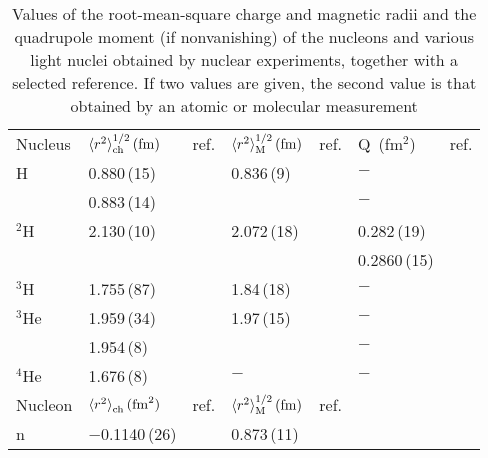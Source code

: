 \documentclass{svmult}
\begin{document}
\begin{table}
\centering
\caption{Values of the root-mean-square charge and magnetic radii and the
quadrupole moment (if nonvanishing) of the nucleons and various light nuclei
obtained by nuclear experiments, together with a selected reference. If two
values are given, the second value is that obtained by an atomic or molecular
measurement}
\begin{tabular}{l l l l l l l}
\hline \noalign{\smallskip}
Nucleus \hspace{0.1in} 
&$\langle r^2 \rangle_{\rm ch}^{1/2}\, ({\rm fm})$\hspace{0.1in} 
&ref.\hspace{0.3in} 
& $\langle r^2 \rangle_{\rm M}^{1/2}\, ({\rm fm})$ \hspace{0.2in}
&ref. \hspace{0.15in} 
&Q\, (fm$^2$) \hspace{0.3in} 
& ref.  \\ \noalign{\smallskip} \hline
{ }H   & 0.880\,(15)&\cite{Coulomb}&0.836\,(9)&\cite{fit}  &\mbox{$-$}  & 
\rule{0in}{2.5ex} \\ 
      & 0.883\,(14)&\cite{2loop} &           &            &\mbox{$-$}  & \\ 
\hline
$^2$H & 2.130\,(10)&\cite{ST}    & 2.072\,(18)&\cite{ingo}&0.282\,(19) &
\cite{Qnuc} \rule{0in}{2.5ex} \\ 
      &            &             &           &            &0.2860\,(15)&
\cite{Qhd1,Qhd2} \rule{0in}{2.5ex} \\ \hline
$^3$H & 1.755\,(87)&\cite{ingo}  & 1.84\,(18)&\cite{ingo} &\mbox{$-$}  & 
\rule{0in}{2.5ex} \\ \hline
$^3$He& 1.959\,(34)&\cite{ingo}  & 1.97\,(15)&\cite{ingo} &\mbox{$-$}  &
\rule{0in}{2.5ex} \\
      & 1.954\,(8) &\cite{shiner}&           &            &\mbox{$-$}  & \\ 
\hline
$^4$He& 1.676\,(8) &\cite{sickx} & \mbox{$-$}&            &\mbox{$-$}  &
\rule{0in}{2.5ex}\\ \hline \hline
\noalign{\smallskip}
Nucleon & $\langle r^2 \rangle_{\rm ch}^{ }\, ({\rm fm}^2)$ &ref. & 
$\langle r^2 \rangle_{\rm M}^{1/2}\, ({\rm fm})$ &ref. & \rule{0in}{2.5ex} \\
\noalign{\smallskip} \hline
  n   &\mbox{$-$}0.1140\,(26)&\cite{neutron}&0.873\,(11)&\cite{nmag}& &
\\ \hline
\end{tabular}
\end{table}
\end{document}
